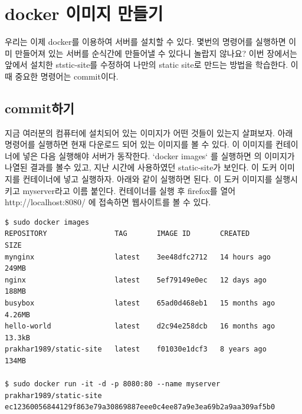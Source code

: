\chapter{docker 이미지 만들기}
우리는 이제 docker를 이용하여 서버를 설치할 수 있다. 몇번의 명령어를 실행하면 이미 만들어져 있는 서버를 순식간에 만들어낼 수 있다니 놀랍지 않나요? 이번 장에서는 앞에서 설치한 ststic-site를 수정하여 나만의 static site로 만드는 방법을 학습한다. 이 때 중요한 명령어는 commit이다. 

\section{commit하기}
지금 여러분의 컴퓨터에 설치되어 있는 이미지가 어떤 것들이 있는지 살펴보자. 
아래 명령어를 실행하면 현재 다운로드 되어 있는 이미지를 볼 수 있다. 이 이미지를 컨테이너에 넣은 다음 실행해야 서버가 동작한다. `docker images` 를 실행하면 의 이미지가 나열된 결과를 볼수 있고, 지난 시간에 사용하였던 static-site가 보인다. 이 도커 이미지를 컨테이너에 넣고 실행하자. 아래와 같이 실행하면 된다. 이 도커 이미지를 실행시키고 myserver라고 이름 붙인다. 컨테이너를 실행 후 firefox를 열어 http://localhost:8080/ 에 접속하면 웹사이트를 볼 수 있다. 


\begin{lstlisting}
$ sudo docker images 
REPOSITORY                TAG       IMAGE ID       CREATED         SIZE
mynginx                   latest    3ee48dfc2712   14 hours ago    249MB
nginx                     latest    5ef79149e0ec   12 days ago     188MB
busybox                   latest    65ad0d468eb1   15 months ago   4.26MB
hello-world               latest    d2c94e258dcb   16 months ago   13.3kB
prakhar1989/static-site   latest    f01030e1dcf3   8 years ago     134MB

$ sudo docker run -it -d -p 8080:80 --name myserver prakhar1989/static-site
ec12360056844129f863e79a30869887eee0c4ee87a9e3ea69b2a9aa309af5b0
\end{lstlisting}

